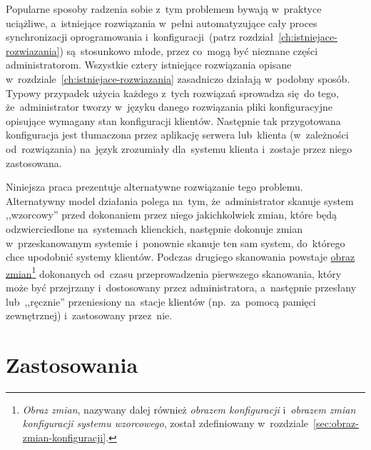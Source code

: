 \documentclass[thesis]{subfiles}
\begin{document}
Popularne sposoby radzenia sobie z~tym problemem bywają w~praktyce uciążliwe, a~istniejące rozwiązania w~pełni automatyzujące cały proces synchronizacji oprogramowania i~konfiguracji~(patrz rozdział~\ref{ch:istniejace-rozwiazania}) są~stosunkowo młode, przez co~mogą być nieznane części administratorom. Wszystkie cztery istniejące rozwiązania opisane w~rozdziale~\ref{ch:istniejace-rozwiazania} zasadniczo działają w~podobny sposób. Typowy przypadek użycia każdego z~tych rozwiązań sprowadza się~do tego, że~administrator tworzy w~języku danego rozwiązania pliki konfiguracyjne opisujące wymagany stan konfiguracji klientów. Następnie tak przygotowana konfiguracja jest tłumaczona przez aplikację serwera lub~klienta (w~zależności od~rozwiązania) na~język zrozumiały dla~systemu klienta i~zostaje przez niego zastosowana.

Niniejsza praca prezentuje alternatywne rozwiązanie tego problemu. Alternatywny model działania polega na~tym, że~administrator skanuje system ,,wzorcowy'' przed dokonaniem przez niego jakichkolwiek zmian, które będą odzwierciedlone na~systemach klienckich, następnie dokonuje zmian w~przeskanowanym systemie i~ponownie skanuje ten sam system, do~którego chce upodobnić systemy klientów. Podczas drugiego skanowania powstaje \hyperref[sec:obraz-zmian-konfiguracji]{obraz zmian}\footnote{\emph{Obraz zmian}, nazywany dalej również \emph{obrazem konfiguracji} i~\emph{obrazem zmian konfiguracji systemu wzorcowego}, został zdefiniowany w~rozdziale~\ref{sec:obraz-zmian-konfiguracji}.} dokonanych od~czasu przeprowadzenia pierwszego skanowania, który może być przejrzany i~dostosowany przez administratora, a~następnie przesłany lub~,,ręcznie'' przeniesiony na~stacje klientów (np.~za~pomocą pamięci zewnętrznej) i~zastosowany przez~nie.


\section{Zastosowania}
\end{document}
